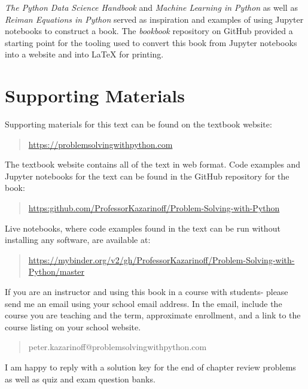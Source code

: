 \documentclass{book}
\begin{document}
\emph{The Python Data Science Handbook} and \emph{Machine Learning in
Python} as well as \emph{Reiman Equations in Python} served as
inspiration and examples of using Jupyter notebooks to construct a book.
The \emph{bookbook} repository on GitHub provided a starting point for
the tooling used to convert this book from Jupyter notebooks into a
website and into LaTeX for printing.
    




    
        \section{Supporting Materials}\label{supporting-materials}
    




    
        Supporting materials for this text can be found on the textbook website:

\begin{quote}
\url{https://problemsolvingwithpython.com}
\end{quote}

The textbook website contains all of the text in web format. Code
examples and Jupyter notebooks for the text can be found in the GitHub
repository for the book:

\begin{quote}
\url{https:github.com/ProfessorKazarinoff/Problem-Solving-with-Python}
\end{quote}

Live notebooks, where code examples found in the text can be run without
installing any software, are available at:

\begin{quote}
\url{https://mybinder.org/v2/gh/ProfessorKazarinoff/Problem-Solving-with-Python/master}
\end{quote}

If you are an instructor and using this book in a course with students-
please send me an email using your school email address. In the email,
include the course you are teaching and the term, approximate
enrollment, and a link to the course listing on your school website.

\begin{quote}
peter.kazarinoff@problemsolvingwithpython.com
\end{quote}

I am happy to reply with a solution key for the end of chapter review
problems as well as quiz and exam question banks.
    
\end{document}

